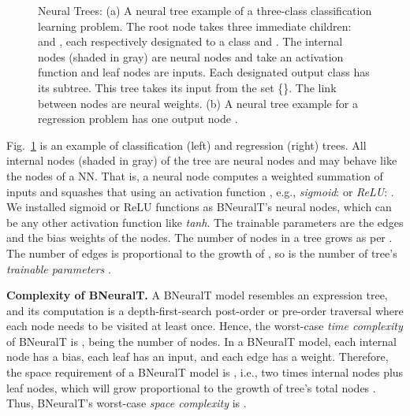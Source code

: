 \documentclass[11pt,a4paper]{article}
\begin{document}
    \begin{figure}
        \centering
        \caption{Neural Trees: (a) A neural tree example of a three-class classification learning problem. The root node  takes three immediate children:  and , each respectively designated to a class  and . The internal nodes (shaded in gray) are neural nodes and take an activation function  and leaf nodes are inputs. Each designated output class has its subtree. This tree takes its input from the set \{\}. The link  between nodes are neural weights. (b) A neural tree example for a regression  problem has one output node .}
        \label{fig:neural_tree}
    \end{figure}
    
    Fig.~\ref{fig:neural_tree} is an example of classification (left) and regression (right) trees. All internal nodes (shaded in gray) of the tree are neural nodes and may behave like the nodes of a NN. That is, a neural node computes a weighted summation  of inputs and squashes that using an activation function , e.g., \textit{sigmoid}:  or \textit{ReLU}: . We installed sigmoid or ReLU functions as BNeuralT's neural nodes, which can be any other activation function like \textit{tanh}. The trainable parameters  are the edges and the bias weights of the nodes. The number of nodes  in a tree grows as per . The number of edges  is proportional to the growth of , so is the number of tree's \textit{trainable parameters} .
    
    \textbf{Complexity of BNeuralT.} A BNeuralT model resembles an expression tree, and its computation is a depth-first-search post-order or pre-order traversal where each node needs to be visited at least once. Hence, the worst-case \textit{time complexity} of BNeuralT is ,  being the number of nodes. In a BNeuralT model, each internal node has a bias, each leaf has an input, and each edge has a weight. Therefore, the space requirement of a BNeuralT model is , i.e., two times internal nodes plus leaf nodes, which will grow  proportional to the growth of tree's total nodes . Thus, BNeuralT's worst-case \textit{space complexity} is .
    
\end{document}
